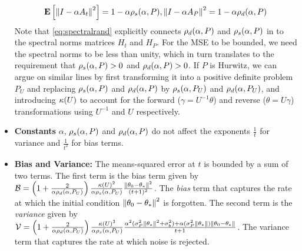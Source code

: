 \begin{itemize}[leftmargin=*, before = \leavevmode\vspace{-\baselineskip}]
\begin{comment}
The output $\thh_t$ of the algorithm \eqref{eq:lsa} is the average of the internal states at times $s=0,\ldots,t-1$. The error dynamics of the internal states by looking at the behavior of $e_t\eqdef \theta_t-\ts$.
\begin{align}\label{eq:errec}
\theta_t&=\theta_{t-1}+\alpha(b_t-A_t\theta_{t-1})\nn\\
\theta_t-\ts&=\theta_{t-1}-\ts+\alpha\left(b_t-A_t(\theta_{t-1}-\ts+\ts)\right)\nn\\
e_t&=e_{t-1}+\alpha(b_t-A_t e_t -A_t\ts)\nn\\
e_t&=\underbrace{((I-\alpha A_t))}_{\text{Random-Matrix}} e_{t-1}+\underbrace{\alpha(N_t -(M_t)\ts)}_{\text{Noise}}
\end{align}
From \eqref{errec} it is clear that the error dynamics depends on the $i)$ properties of the random matrix, $ii)$ properties of the noise. In the absence of the noise term in \eqref{eq:errec}, we have $e_t=(I-\alpha A_t) e_{t-1}=\Pi_{s=1}(I-\alpha A_s) e_0$, i.e., the inital error is get multiplied by a product of random matrices. In such a scenario, we can guess that whether or not the algorithm forgets the bias $\norm{\theta_0-\ts}$, depends on whether the matrix product is contracting. One way to characterize this contracting property is to look at the spectral radius of the random matrix, which is given by
\end{comment}
\begin{align}\label{eq:spectralrand}
\mathbf{E}\left[\left\| I-\alpha A_t\right\|^2\right]=1-\alpha \rho_s(\alpha,P), {\left\| I-\alpha A_P\right\|^2}=1-\alpha \rho_d(\alpha,P)
\end{align}
Note that \eqref{eq:spectralrand} explicitly connects $\rho_d(\alpha,P)$ and $\rho_s(\alpha,P)$ in  to the spectral norms matrices $H_t$ and $H_P$. For the MSE to be bounded, we need the spectral norms to be less than unity, which in turn translates to the requirement that $\rho_s(\alpha,P)>0$ and $\rho_d(\alpha,P)>0$. If $P$ is Hurwitz, we can argue on similar lines by first transforming it into a positive definite problem $P_U$ and replacing $\rho_s(\alpha,P)$ and $\rho_d(\alpha,P)$ by $\rho_s(\alpha,P_U)$ and $\rho_d(\alpha,P_U)$, and introducing $\kappa(U)$ to account for the forward ($\gamma=U^{-1}\theta$) and reverse ($\theta=U\gamma$) transformations using $U^{-1}$ and $U$ respectively.
\item \textbf{Constants} {$\alpha$, $\rho_s(\alpha,P)$ and $\rho_d(\alpha,P)$} do not affect the exponents $\frac{1}{t}$ for variance and $\frac{1}{t^2}$ for bias terms.
\item \textbf{Bias and Variance:} The means-squared error at $t$ is bounded by a sum of two terms. The first term is the bias term given by $\mathcal{B}=\left(1+\frac2{\alpha\rho_d(\alpha,P_U)}\right)\frac{\kappa(U)^2}{\alpha \rho_s(\alpha,P_U)}\frac{\left\| \theta_0-\theta_*\right\|^2}{(t+1)^2}$.  The \emph{bias} term that captures the rate at which the initial condition $\left\| \theta_0-\theta_*\right\|^2$ is forgotten. The second term is the \emph{variance} given by $\mathcal{V}=\left(1+\frac2{\alpha\rho_d(\alpha,P_U)}\right)\frac{\kappa(U)^2}{\alpha \rho_s(\alpha,P_U)} \frac{\alpha^2(\sigma_P^2\left\| \theta_*\right\|^2+\sigma_b^2)+\alpha (\sigma_P^2\left\| \theta_*\right\|)\left\| \theta_0-\theta_*\right\|}{t+1} $. The variance term that captures the rate at which noise is rejected.

\end{itemize}
